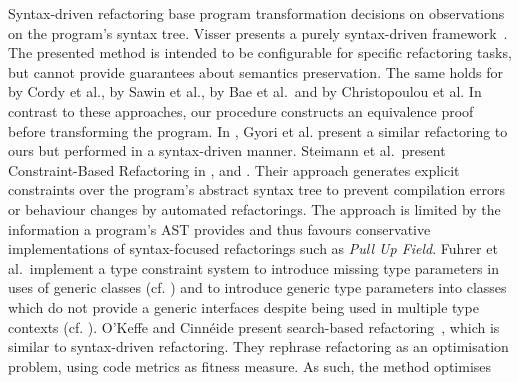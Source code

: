 \documentclass[runningheads,a4paper]{llncs}
\begin{document}
Syntax-driven refactoring base program transformation decisions
on observations on the program's syntax tree.  Visser
presents a purely syntax-driven framework~\cite{stratego}.  The
presented method is intended to be configurable for specific
refactoring tasks, but cannot provide guarantees about semantics
preservation.  The same holds for~\cite{txl} by Cordy et al.,
\cite{sawin} by Sawin et al., \cite{bae} by Bae et al.~and
\cite{chris} by Christopoulou et al.  In contrast to these approaches,
our procedure constructs an equivalence proof before transforming the
program. In \cite{conf/sigsoft/GyoriFDL13}, Gyori et al. present a
similar refactoring to ours but performed in a syntax-driven manner.
%
Steimann et al.~present Constraint-Based Refactoring in \cite{Steimann2011},
\cite{Steimann2012Pilgrim} and \cite{Steimann2011KollePilgrim}. Their approach
generates explicit constraints over the program's abstract syntax tree to
prevent compilation errors or behaviour changes by automated refactorings.
The approach is limited by the information
a program's AST provides and thus favours conservative implementations of
syntax-focused refactorings such as \emph{Pull Up Field}.
%
Fuhrer et al.~implement a type constraint system to introduce missing type
parameters in uses of generic classes (cf. \cite{DBLP:conf/ecoop/FuhrerTKDK05})
and to introduce generic type parameters into classes which do not provide
a generic interfaces despite being used in multiple type contexts
(cf. \cite{DBLP:conf/icse/KiezunETF07}).
%
%
%
O'Keffe and Cinn{\'{e}}ide present search-based
refactoring~\cite{search1, search2}, which is similar to syntax-driven
refactoring.  They rephrase refactoring as an optimisation problem,
using code metrics as fitness measure.  As such, the method optimises
\end{document}
